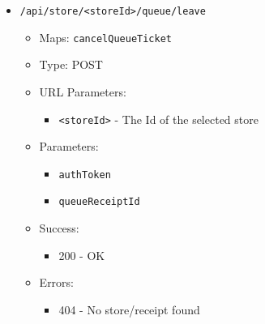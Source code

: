 \begin{itemize}
    \item \texttt{/api/store/<storeId>/queue/leave}
    \begin{itemize}
        \item Maps: \texttt{cancelQueueTicket}
        \item Type: POST
        \item URL Parameters:
        \begin{itemize}
            \item \texttt{<storeId>} - The Id of the selected store
        \end{itemize}
        \item Parameters:
        \begin{itemize}
            \item \texttt{authToken}
            \item \texttt{queueReceiptId}
        \end{itemize}
        \item Success:
        \begin{itemize}
            \item 200 - OK
        \end{itemize}
        \item Errors:
        \begin{itemize}
            \item 404 - No store/receipt found
        \end{itemize}
    \end{itemize}


\end{itemize}
